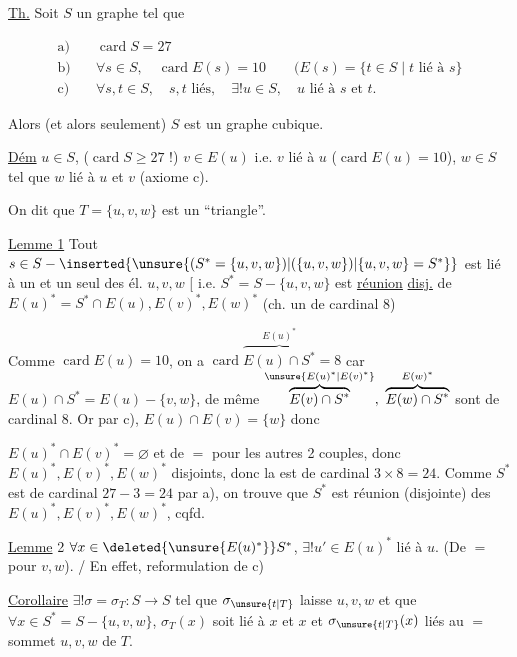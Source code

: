 
\uline{Th.} Soit $S$ un graphe tel que

\[
\begin{aligned}
\text{a)}\quad &\operatorname{card} S=27\\
\text{b)}\quad &\forall s\in S,\quad \operatorname{card} E(s)=10\qquad
 (E(s)=\{t\in S\mid t\text{ lié à }s\}\\
\text{c)}\quad &\forall s,t\in S,\quad s,t\text{ liés},\quad
 \exists!u\in S,\quad u\text{ lié à }s\text{ et }t.
\end{aligned}
\]

Alors (et alors seulement) $S$ est un graphe cubique.

\uline{Dém}  $u\in S$,  ($\operatorname{card}S\geq27$ !) $v\in E(u)$ i.e. $v$ lié à $u$ ($\operatorname{card} E(u)=10$), $w\in S$ tel que $w$ lié à $u$ et $v$ (axiome c).

On dit que $T=\{u,v,w\}$ est un ``triangle''.

\uline{Lemme 1} Tout $s\in S-\inserted{\unsure{(S^*=\{u,v,w\})|(\{u,v,w\})|\{u,v,w\}=S^*}}$ est lié à un et un seul des él. $u,v,w$ [ i.e. $S^*=S-\{u,v,w\}$ est \uline{réunion} \uline{disj.} de $E(u)^*=S^*\cap E(u),E(v)^*,E(w)^*$ (ch. un de cardinal 8)

Comme $\operatorname{card} E(u)=10$,  on a $\operatorname{card}\overbrace{E(u)\cap S^*}^{E(u)^*}=8$ car $E(u)\cap S^*=E(u)-\{v,w\}$, de même  $\overbrace{E(v)\cap S^*}^{\unsure{E(u)^*|E(v)^*}},\ \overbrace{E(w)\cap S^*}^{E(w)^*}$ sont de cardinal 8. Or par c), $E(u)\cap E(v)=\{w\}$ donc

$E(u)^*\cap E(v)^*=\varnothing$ et de $=$ pour les autres 2 couples, donc $E(u)^*,E(v)^*,E(w)^*$ disjoints, donc la  est de cardinal  $3\times8=24$. Comme $S^*$ est de cardinal $27-3=24$ par a), on trouve que $S^*$ est réunion (disjointe) des $E(u)^*,E(v)^*,E(w)^*$, cqfd.

\uline{Lemme} 2 $\forall x\in \deleted{\unsure{E(u)^*}}S^*$, $\exists!u'\in E(u)^*$ lié à $u$. (De $=$ pour $v,w$). / En effet,  reformulation de c)

\uline{Corollaire} $\exists!\sigma=\sigma_T:S\longrightarrow S$ tel que $\sigma_{\unsure{t|T}}$ laisse $u,v,w$ et que $\forall x\in S^*=S-\{u,v,w\}$, $\sigma_T(x)$ soit lié à $x$ et $x$ et $\sigma_{\unsure{t|T}}(x)$ liés au $=$ sommet $u,v,w$ de $T$.

